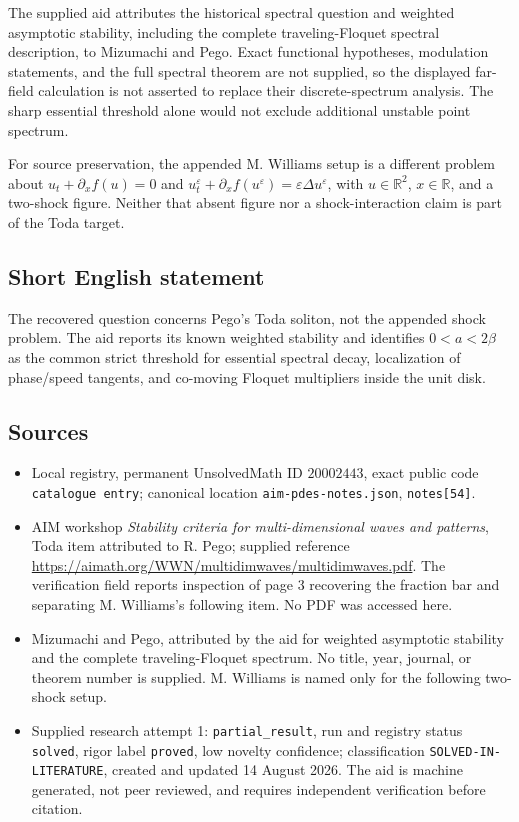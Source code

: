 \documentclass[11pt]{article}
\newcommand{\R}{\mathbb{R}}
\begin{document}
The supplied aid attributes the historical spectral question and weighted asymptotic stability, including the complete traveling-Floquet spectral description, to Mizumachi and Pego. Exact functional hypotheses, modulation statements, and the full spectral theorem are not supplied, so the displayed far-field calculation is not asserted to replace their discrete-spectrum analysis. The sharp essential threshold alone would not exclude additional unstable point spectrum.

For source preservation, the appended M. Williams setup is a different problem about \(u_t+\partial_xf(u)=0\) and \(u_t^\varepsilon+\partial_xf(u^\varepsilon)=\varepsilon\Delta u^\varepsilon\), with \(u\in\R^2\), \(x\in\R\), and a two-shock figure. Neither that absent figure nor a shock-interaction claim is part of the Toda target.
\subsection{Short English statement}
The recovered question concerns Pego's Toda soliton, not the appended shock problem. The aid reports its known weighted stability and identifies \(0<a<2\beta\) as the common strict threshold for essential spectral decay, localization of phase/speed tangents, and co-moving Floquet multipliers inside the unit disk.
\subsection{Sources}
\begin{itemize}
\item Local registry, permanent UnsolvedMath ID \(20002443\), exact public code \texttt{catalogue entry}; canonical location \texttt{aim-pdes-notes.json}, \texttt{notes[54]}.
\item AIM workshop \emph{Stability criteria for multi-dimensional waves and patterns}, Toda item attributed to R. Pego; supplied reference \url{https://aimath.org/WWN/multidimwaves/multidimwaves.pdf}. The verification field reports inspection of page 3 recovering the fraction bar and separating M. Williams's following item. No PDF was accessed here.
\item Mizumachi and Pego, attributed by the aid for weighted asymptotic stability and the complete traveling-Floquet spectrum. No title, year, journal, or theorem number is supplied. M. Williams is named only for the following two-shock setup.
\item Supplied research attempt 1: \texttt{partial\_result}, run and registry status \texttt{solved}, rigor label \texttt{proved}, low novelty confidence; classification \texttt{SOLVED-IN-LITERATURE}, created and updated 14 August 2026. The aid is machine generated, not peer reviewed, and requires independent verification before citation.
\end{itemize}
\end{document}
